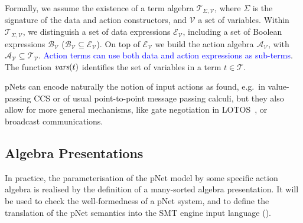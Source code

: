 \documentclass[smallcondensed]{svjour3}
\newcommand{\ERIC}[1]{\textcolor{blue}{#1}}
\newcommand{\QIN}[1]{\textcolor{airforceblue}{#1}}
\newcommand{\cT}{\ensuremath{\mathcal{T}}}
\newcommand{\cV}{\ensuremath{\mathcal{V}}}
\newcommand{\signature}{\ensuremath{\Sigma}}
\newcommand{\variables}{\ensuremath{\cV}}
\newcommand{\Talg}{\ensuremath{\cT_{\signature,\variables}}}
\def\AlgT{\mathcal{T}}
\newcommand{\eg}[1][\ ]{e.g.#1}
\begin{document}
\renewcommand{\P}{\mathcal V}
\def\Talg{\mathcal{T}_{\Sigma,\P}}
Formally, we assume the existence of a term algebra $\Talg$,
where $\Sigma$ is the signature of the data and action constructors,
and $\P$ a set of variables. Within $\Talg$, we distinguish a set of
data expressions $\mathcal{E}_\P$, including a set of Boolean
expressions $\mathcal{B}_{\P}$ ($\mathcal{B}_{\P}\subseteq\mathcal{E}_\P$).
On top of $\mathcal{E}_\P$ we build the action algebra
$\mathcal{A}_\P$, with $\mathcal{A}_\P\subseteq\mathcal{T}_\P$.
 \ERIC{Action terms can use both data and action expressions as sub-terms}.
The function $\vars(t)$ identifies the set of variables in a term
$t\in\AlgT$.

pNets can encode naturally the notion of input actions as found,
\eg in value-passing CCS 
\cite{Milner89} or of usual point-to-point message passing calculi,
but they also allow 
for more general mechanisms, like gate negotiation in LOTOS~\cite{LotosISO89}, or broadcast
communications.

\subsection{Algebra Presentations}
In practice, the parameterisation of the pNet model by some specific
action algebra is realised by the definition of a many-sorted algebra
presentation. It will be used to check the
well-formedness of a pNet system, and to define the translation of the pNet
semantics into the SMT engine input language (\cite{BarFT-RR-17}).
\end{document}
